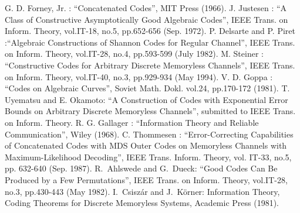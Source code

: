 \begin{thebibliography}{99}
 G. D. Forney, Jr. : ``Concatenated Codes'', MIT Press (1966).
%
 J. Justesen : ``A Class of Constructive Asymptotically Good
Algebraic Codes'', IEEE Trans. on Inform. Theory, vol.IT-18, no.5, 
 pp.652-656 (Sep. 1972).
%
 P. Delsarte and P. Piret :``Algebraic Constructions of Shannon
Codes for Regular Channel'', IEEE Trans. on Inform. Theory, vol.IT-28, no.4,
pp.593-599 (July 1982).
%
 M. Steiner : ``Constructive Codes for Arbitrary Discrete 
Memoryless Channels'', IEEE Trans. on Inform. Theory, vol.IT-40,
no.3, pp.929-934 (May 1994).
%
 V. D. Goppa : ``Codes on Algebraic Curves'', Soviet Math. Dokl. 
vol.24, pp.170-172 (1981).
%
 T. Uyematsu and E. Okamoto: ``A Construction of Codes 
with Exponential Error Bounds on Arbitrary Discrete Memoryless Channels'',
submitted to IEEE Trans. on Inform. Theory.
%
 R. G. Gallager : 
``Information Theory and Reliable Communication'', Wiley (1968).
%
C. Thommesen :
``Error-Correcting Capabilities of Concatenated Codes
with MDS Outer Codes on Memoryless Channels with Maximum-Likelihood Decoding'',
 IEEE Trans. Inform. Theory, vol. IT-33, no.5, pp. 632-640 (Sep. 1987).
%
R.~Ahlswede and G.~Dueck: ``Good Codes Can Be Produced by a Few
Permutations'', IEEE Trans. on Inform. Theory, vol.IT-28,
no.3, pp.430-443 (May 1982).
%
 I.~Csisz\'{a}r and J.~K\"{o}rner: Information Theory, 
Coding Theorems for Discrete Memoryless Systems, Academic Press (1981).

\end{thebibliography}